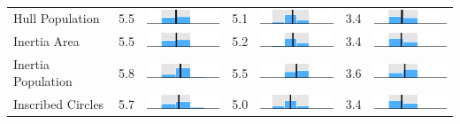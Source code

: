 \begin{table}
\begin{tabular}{l rm{7em} rm{7em} rm{7em}}
Hull Population        &   5.5 &       \includegraphics[width=7em]{mini_hist/MN_2008_hull_p} &   5.1 &       \includegraphics[width=7em]{mini_hist/MN_2012_hull_p} &   3.4 &       \includegraphics[width=7em]{mini_hist/MN_2016_hull_p} \\
Inertia Area           &   5.5 &    \includegraphics[width=7em]{mini_hist/MN_2008_inertia_a} &   5.2 &    \includegraphics[width=7em]{mini_hist/MN_2012_inertia_a} &   3.4 &    \includegraphics[width=7em]{mini_hist/MN_2016_inertia_a} \\
Inertia Population     &   5.8 &    \includegraphics[width=7em]{mini_hist/MN_2008_inertia_p} &   5.5 &    \includegraphics[width=7em]{mini_hist/MN_2012_inertia_p} &   3.6 &    \includegraphics[width=7em]{mini_hist/MN_2016_inertia_p} \\
Inscribed Circles      &   5.7 &    \includegraphics[width=7em]{mini_hist/MN_2008_ehrenburg} &   5.0 &    \includegraphics[width=7em]{mini_hist/MN_2012_ehrenburg} &   3.4 &    \includegraphics[width=7em]{mini_hist/MN_2016_ehrenburg} \\

\end{tabular}
\end{table}
